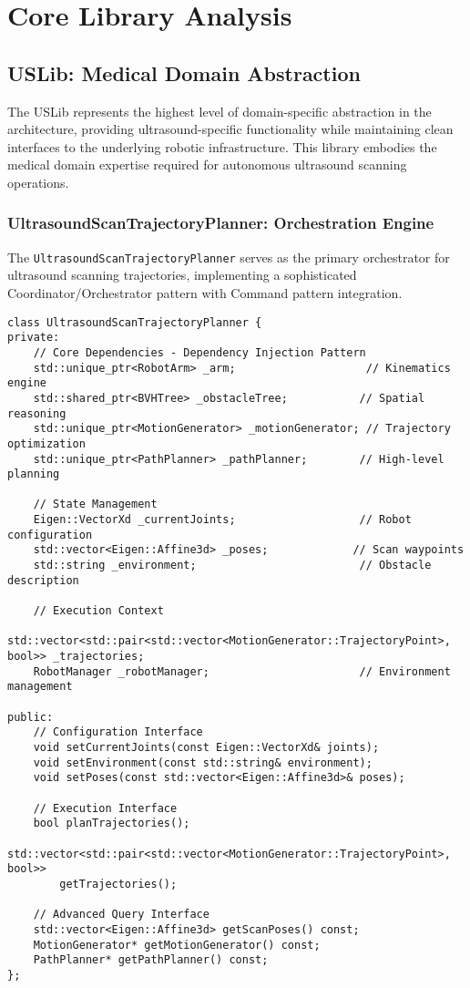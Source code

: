 \chapter{Core Library Analysis}
\label{ch:core_libraries}

\section{USLib: Medical Domain Abstraction}
\label{sec:uslib_analysis}

The USLib represents the highest level of domain-specific abstraction in the \rus{} architecture, providing ultrasound-specific functionality while maintaining clean interfaces to the underlying robotic infrastructure. This library embodies the medical domain expertise required for autonomous ultrasound scanning operations.

\subsection{UltrasoundScanTrajectoryPlanner: Orchestration Engine}

The \texttt{UltrasoundScanTrajectoryPlanner} serves as the primary orchestrator for ultrasound scanning trajectories, implementing a sophisticated Coordinator/Orchestrator pattern with Command pattern integration.

\begin{lstlisting}[caption={UltrasoundScanTrajectoryPlanner Class Definition}, label={lst:us_trajectory_planner}]
class UltrasoundScanTrajectoryPlanner {
private:
    // Core Dependencies - Dependency Injection Pattern
    std::unique_ptr<RobotArm> _arm;                    // Kinematics engine
    std::shared_ptr<BVHTree> _obstacleTree;           // Spatial reasoning
    std::unique_ptr<MotionGenerator> _motionGenerator; // Trajectory optimization
    std::unique_ptr<PathPlanner> _pathPlanner;        // High-level planning
    
    // State Management
    Eigen::VectorXd _currentJoints;                   // Robot configuration
    std::vector<Eigen::Affine3d> _poses;             // Scan waypoints
    std::string _environment;                         // Obstacle description
    
    // Execution Context
    std::vector<std::pair<std::vector<MotionGenerator::TrajectoryPoint>, bool>> _trajectories;
    RobotManager _robotManager;                       // Environment management
    
public:
    // Configuration Interface
    void setCurrentJoints(const Eigen::VectorXd& joints);
    void setEnvironment(const std::string& environment);
    void setPoses(const std::vector<Eigen::Affine3d>& poses);
    
    // Execution Interface
    bool planTrajectories();
    std::vector<std::pair<std::vector<MotionGenerator::TrajectoryPoint>, bool>> 
        getTrajectories();
    
    // Advanced Query Interface
    std::vector<Eigen::Affine3d> getScanPoses() const;
    MotionGenerator* getMotionGenerator() const;
    PathPlanner* getPathPlanner() const;
};
\end{lstlisting}

